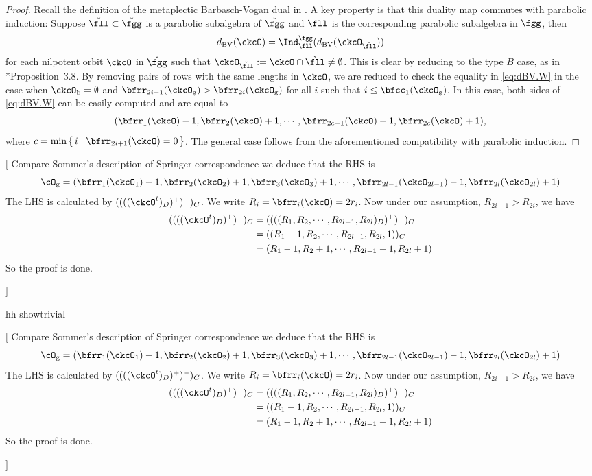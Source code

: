 \documentclass[12pt,a4paper]{amsart}
\newcommand{\trivial}[2][]{\if\relax\detokenize{#1}\relax
  {%
      \color{orange} \vspace{0em} $[$  #2 $]$
      \color{black}
  }
  \else
\ifx#1h
\ifcsname showtrivial\endcsname
{%
    \color{orange} \vspace{0em}  $[$ #2 $]$
    \color{black}
}
\fi
\else {\red Wrong argument!} \fi
\fi
}
\numberwithin{equation}{section}
\theoremstyle{remark}
\def\dBV{d_{\mathrm{BV}}}
\def\ckfgg{{\check \fgg}}
\begin{document}
\begin{proof}
    Recall the definition of the metaplectic Barbasch-Vogan dual in
    \cite{BMSZ1}. A key property is that this duality map commutes with parabolic induction: Suppose
    $\ckfll\subset \ckfgg$ is a parabolic subalgebra of $\ckfgg$ and
    $\fll$ is the corresponding parabolic subalgebra in $\fgg$, then
    \begin{equation*}%
      \dBV(\ckcO) =  \Ind_{\fll}^{\fgg}(\dBV(\ckcO_{\ckfll}))
    \end{equation*}
    for each nilpotent orbit $\ckcO$ in $\ckfgg$ such that
    $\ckcO_{\ckfll}:=\ckcO\cap \ckfll\neq \emptyset$. This is clear by reducing
    to the type $B$ case, as in \cite{BMSZ1}*{Proposition~3.8}. By removing pairs
    of rows with the same lengths in $\ckcO$, we are reduced to check the equality in \eqref{eq:dBV.W}
    in the case when $\ckcO_{\mathrm b}=\emptyset$ and
    $\bfrr_{2i-1}(\ckcO_{\mathrm g})>\bfrr_{2i}(\ckcO_{\mathrm g})$ for all $i$ such that
    $i\leq \bfcc_{1}(\ckcO_{\mathrm g})$. In this case, both sides of \eqref{eq:dBV.W}
    can be easily computed and are equal to
    \[
      (\bfrr_{1}(\ckcO)-1, \bfrr_{2}(\ckcO)+1, \cdots,\bfrr_{2c-1}(\ckcO)-1,\bfrr_{2c}(\ckcO)+1),
    \]
    where $c = \min\set{i|\bfrr_{2i+1}(\ckcO)=0}$. The general case follows from the aforementioned compatibility with parabolic induction.  \end{proof}



    \trivial[h]{ Compare Sommer's description of Springer correspondence we
      deduce that the RHS is
      \[
        \cO_{\mathrm g} = (\bfrr_{1}(\ckcO_{1})-1,\bfrr_{2}(\ckcO_{2})+1,\bfrr_{3}(\ckcO_{3})+1, \cdots, \bfrr_{2l-1}(\ckcO_{2l-1})-1,\bfrr_{2l}(\ckcO_{2l})+1)
      \]
      The LHS is calculated by $((((\ckcO^{t})_{D})^{+})^{-})_{C}$. We write
      $R_{i}=\bfrr_{i}(\ckcO)=2r_{i}$. Now under our assumption,
      $R_{2i-1}>R_{2i}$, we have
      \[
        \begin{split}
          ((((\ckcO^{t})_{D})^{+})^{-})_{C} &=
          ((((R_{1},R_{2}, \cdots, R_{2l-1},R_{2l})_{D})^{+})^{-})_{C}\\
          &=((R_{1}-1,R_{2}, \cdots, R_{2l-1},R_{2l},1))_{C}\\
          &=(R_{1}-1,R_{2}+1, \cdots, R_{2l-1}-1,R_{2l}+1)\\
        \end{split}
      \]
      So the proof is done.

    }
\end{document}
